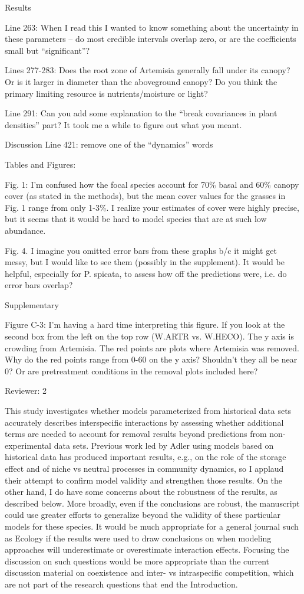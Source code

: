 \documentclass[12pt]{article}
\begin{document}
{Results

Line 263:  When I read this I wanted to know something about the uncertainty in these parameters – do most credible intervals overlap zero, or are the coefficients small but “significant”?

Lines 277-283: Does the root zone of Artemisia generally fall under its canopy? Or is it larger in diameter than the aboveground canopy? Do you think the primary limiting resource is nutrients/moisture or light?

Line 291: Can you add some explanation to the “break covariances in plant densities” part? It took me a while to figure out what you meant. 

Discussion
Line 421: remove one of the “dynamics” words 

Tables and Figures:

Fig. 1: I’m confused how the focal species account for 70\% basal and 60\% canopy cover (as stated in the methods), but the mean cover values for the grasses in Fig. 1 range from only 1-3\%. I realize your estimates of cover were highly precise, but it seems that it would be hard to model species that are at such low abundance.

Fig. 4. I imagine you omitted error bars from these graphs b/c it might get messy, but I would like to see them (possibly in the supplement). It would be helpful, especially for P. spicata, to assess how off the predictions were, i.e. do error bars overlap?

Supplementary

Figure C-3: I’m having a hard time interpreting this figure. If you look at the second box from the left on the top row (W.ARTR vs. W.HECO). The y axis is crowding from Artemisia. The red points are plots where Artemisia was removed. Why do the red points range from 0-60 on the y axis? Shouldn't they all be near 0? Or are pretreatment conditions in the removal plots included here? 


Reviewer: 2

This study investigates whether models parameterized from historical data sets accurately describes
interspecific interactions by assessing whether additional terms are needed to account for removal
results beyond predictions from non-experimental data sets. Previous work led by Adler using models
based on historical data has produced important results, e.g., on the role of the storage effect and of
niche vs neutral processes in community dynamics, so I applaud their attempt to confirm model validity
and strengthen those results. On the other hand, I do have some concerns about the robustness of the
results, as described below. More broadly, even if the conclusions are robust, the manuscript could use
greater efforts to generalize beyond the validity of these particular models for these species. It would
be much appropriate for a general journal such as Ecology if the results were used to draw conclusions
on when modeling approaches will underestimate or overestimate interaction effects. Focusing the
discussion on such questions would be more appropriate than the current discussion material on
coexistence and inter- vs intraspecific competition, which are not part of the research questions that
end the Introduction.

}
\end{document}
